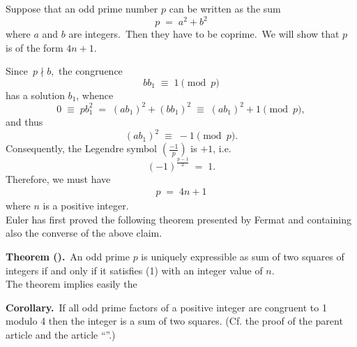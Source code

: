 \documentclass[12pt]{article}
\begin{document}
Suppose that an odd prime number $p$ can be written as the sum
$$p \;=\; a^2\!+\!b^2$$
where $a$ and $b$ are integers.\, Then they have to be coprime.\, 
We will show that $p$ is of the form $4n\!+\!1$.

Since\, $p \nmid b$,\, the congruence
$$bb_1 \;\equiv\; 1 \pmod p$$
has a solution $b_1$, whence
$$0 \;\equiv\; pb_1^2 \;=\; (ab_1)^2\!+\!(bb_1)^2 \;\equiv\; (ab_1)^2\!+\!1 \pmod p,$$
and thus
$$(ab_1)^2 \;\equiv\; -1 \pmod p.$$
Consequently, the Legendre symbol $\left(\frac{-1}{p}\right)$ is $+1$, i.e.
$$(-1)^{\frac{p-1}{2}} \;=\; 1.$$
Therefore, we must have
\begin{align}
p \;=\; 4n\!+\!1
\end{align}
where $n$ is a positive integer.  \\


Euler has first proved the following theorem presented by 
Fermat and containing also the converse of the above claim.

\textbf{Theorem 
().}\, An odd prime $p$ is 
uniquely expressible as sum of two squares of integers if and 
only if it satisfies (1) with an integer value of $n$.\\

The theorem implies easily the 

\textbf{Corollary.}\, If all odd prime factors of a positive 
integer are congruent to 1 modulo 4 then the integer is a sum
of two squares. (Cf. the proof of the parent article and the article 
``''.)
\end{document}
